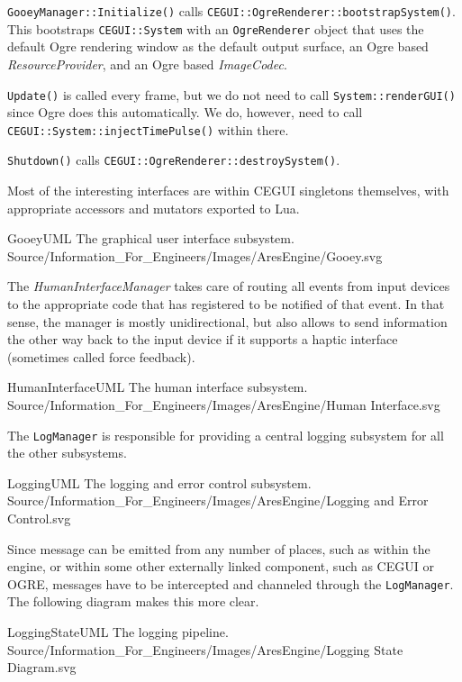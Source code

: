 {\tt GooeyManager::Initialize()} calls {\tt CEGUI::OgreRenderer::bootstrapSystem()}. This bootstraps {\tt CEGUI::System} with an {\tt OgreRenderer} object that uses the default Ogre rendering window as the default output surface, an Ogre based {\it ResourceProvider}, and an Ogre based {\it ImageCodec}.

{\tt Update()} is called every frame, but we do not need to call {\tt System::renderGUI()} since Ogre does this automatically. We do, however, need to call {\tt CEGUI::System::injectTimePulse()} within there.

{\tt Shutdown()} calls {\tt CEGUI::OgreRenderer::destroySystem()}.

Most of the interesting interfaces are within CEGUI singletons themselves, with appropriate accessors and mutators exported to Lua.

\FullPageLandscapeDiagram
    {GooeyUML}
    {The graphical user interface subsystem.}
    {Source/Information_For_Engineers/Images/AresEngine/Gooey.svg}

\page 
{}
The {\it HumanInterfaceManager} takes care of routing all events from input devices to the appropriate code that has registered to be notified of that event. In that sense, the manager is mostly unidirectional, but also allows to send information the other way back to the input device if it supports a haptic interface (sometimes called force feedback).

\FullPageLandscapeDiagram
    {HumanInterfaceUML}
    {The human interface subsystem.}
    {Source/Information_For_Engineers/Images/AresEngine/Human Interface.svg}

\page 
{}
The {\tt LogManager} is responsible for providing a central logging subsystem for all the other subsystems.

\FullPageLandscapeDiagram
    {LoggingUML}
    {The logging and error control subsystem.}
    {Source/Information_For_Engineers/Images/AresEngine/Logging and Error Control.svg}
    
Since message can be emitted from any number of places, such as within the engine, or within some other externally linked component, such as CEGUI or OGRE, messages have to be intercepted and channeled through the {\tt LogManager}. The following diagram makes this more clear.

\FullPageLandscapeDiagram
    {LoggingStateUML}
    {The logging pipeline.}
    {Source/Information_For_Engineers/Images/AresEngine/Logging State Diagram.svg}

